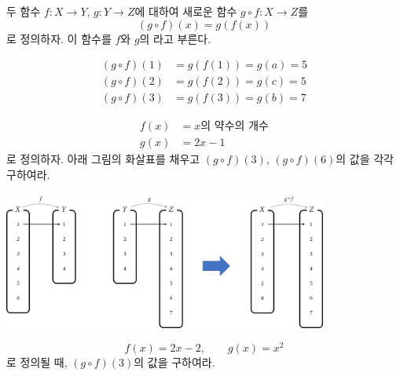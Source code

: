 \documentclass{oblivoir}
\begin{document}

\begin{mdframed}
%
\label{composition2}
두 함수 \(f:X\to Y\), \(g:Y\to Z\)에 대하여 새로운 함수 \(g\circ f:X\to Z\)를
\[(g\circ f)(x)=g(f(x))\]
로 정의하자.
이 함수를 \(f\)와 \(g\)의 라고 부른다.
\end{mdframed}

%
\label{composition3}
\begin{align*}
(g\circ f)(1)&=g(f(1))=g(a)=5\\
(g\circ f)(2)&=g(f(2))=g(c)=5\\
(g\circ f)(3)&=g(f(3))=g(b)=7
\end{align*}

%
\label{composition4}
\begin{align*}
f(x)&=x\text{의 약수의 개수}\\
g(x)&=2x-1
\end{align*}
로 정의하자.
아래 그림의 화살표를 채우고 \((g\circ f)(3)\), \((g\circ f)(6)\)의 값을 각각 구하여라.
\begin{center}
\includegraphics[width=0.8\textwidth]{composition_4}
\end{center}

%
\label{composition5}
\[f(x)=2x-2,\qquad g(x)=x^2\]
로 정의될 때, \((g\circ f)(3)\)의 값을 구하여라.
\end{document}
